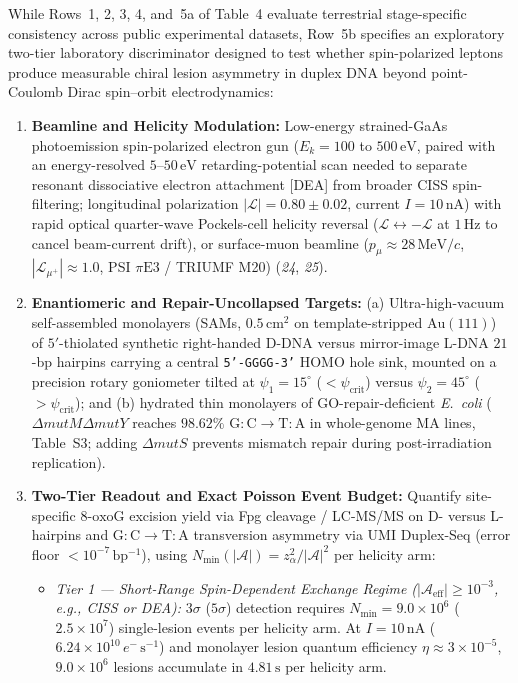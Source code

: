 \documentclass[10pt,letterpaper]{article}
\newcommand{\oxog}{\text{8-oxoG}}
\begin{document}
While Rows~1, 2, 3, 4, and~5a of Table~4 evaluate terrestrial stage-specific consistency across public experimental datasets, Row~5b specifies an exploratory two-tier laboratory discriminator designed to test whether spin-polarized leptons produce measurable chiral lesion asymmetry in duplex DNA beyond point-Coulomb Dirac spin--orbit electrodynamics:
\begin{enumerate}
    \item \textbf{Beamline and Helicity Modulation:} Low-energy strained-GaAs photoemission spin-polarized electron gun ($E_k = 100$ to $500\,\mathrm{eV}$, paired with an energy-resolved $5$--$50\,\mathrm{eV}$ retarding-potential scan needed to separate resonant dissociative electron attachment [DEA] from broader CISS spin-filtering; longitudinal polarization $|\mathcal{L}| = 0.80 \pm 0.02$, current $I = 10\,\mathrm{nA}$) with rapid optical quarter-wave Pockels-cell helicity reversal ($\mathcal{L} \leftrightarrow -\mathcal{L}$ at $1\,\mathrm{Hz}$ to cancel beam-current drift), or surface-muon beamline ($p_\mu \approx 28\,\mathrm{MeV}/c$, $|\mathcal{L}_{\mu^+}| \approx 1.0$, PSI $\pi\mathrm{E3}$ / TRIUMF M20) (\textit{24}, \textit{25}).
    \item \textbf{Enantiomeric and Repair-Uncollapsed Targets:} (a) Ultra-high-vacuum self-assembled monolayers (SAMs, $0.5\,\mathrm{cm^2}$ on template-stripped $\mathrm{Au(111)}$) of $5'$-thiolated synthetic right-handed D-DNA versus mirror-image L-DNA $21$-bp hairpins carrying a central \texttt{5'-GGGG-3'} HOMO hole sink, mounted on a precision rotary goniometer tilted at $\psi_1 = 15^\circ$ ($< \psi_{\mathrm{crit}}$) versus $\psi_2 = 45^\circ$ ($> \psi_{\mathrm{crit}}$); and (b) hydrated thin monolayers of GO-repair-deficient \emph{E.\ coli} ($\Delta\textit{mutM}\Delta\textit{mutY}$ reaches $98.62\%$ $\mathrm{G{:}C \to T{:}A}$ in whole-genome MA lines, Table~S3; adding $\Delta\textit{mutS}$ prevents mismatch repair during post-irradiation replication).
    \item \textbf{Two-Tier Readout and Exact Poisson Event Budget:} Quantify site-specific $\oxog$ excision yield via Fpg cleavage / LC-MS/MS on D- versus L-hairpins and $\mathrm{G{:}C \to T{:}A}$ transversion asymmetry via UMI Duplex-Seq (error floor $< 10^{-7}\,\mathrm{bp^{-1}}$), using $N_{\min}(|\mathcal{A}|) = z_\alpha^2 / |\mathcal{A}|^2$ per helicity arm:
    \begin{itemize}
        \item \emph{Tier 1 --- Short-Range Spin-Dependent Exchange Regime ($|\mathcal{A}_{\mathrm{eff}}| \ge 10^{-3}$, e.g., CISS or DEA):} $3\sigma$ ($5\sigma$) detection requires $N_{\min} = 9.0 \times 10^6$ ($2.5 \times 10^7$) single-lesion events per helicity arm. At $I = 10\,\mathrm{nA}$ ($6.24 \times 10^{10}\,e^-\,\mathrm{s^{-1}}$) and monolayer lesion quantum efficiency $\eta \approx 3 \times 10^{-5}$, $9.0 \times 10^6$ lesions accumulate in $4.81\,\mathrm{s}$ per helicity arm.

\end{itemize}
\end{enumerate}
\end{document}
